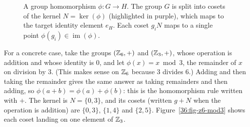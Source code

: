 \begin{figure}[htbp]
\caption{A group homomorphism $\phi: G \to H$. The group $G$ is split into cosets of the kernel $N = \ker(\phi)$ (highlighted in purple), which maps to the target identity element $e_H$. Each coset $g_i N$ maps to a single point $\phi(g_i) \in \operatorname{im}(\phi)$.}\label{36:fig-kernel-coset-homomorphism}
\end{figure}

For a concrete case, take the groups $(\mathbb{Z}_6, +)$ and $(\mathbb{Z}_3, +)$, whose operation is addition and whose identity is $0$, and let $\phi(x) = x \bmod 3$, the remainder of $x$ on division by $3$. (This makes sense on $\mathbb{Z}_6$ because $3$ divides $6$.) Adding and then taking the remainder gives the same answer as taking remainders and then adding, so $\phi(a + b) = \phi(a) + \phi(b)$: this is the homomorphism rule written with $+$. The kernel is $N = \{0, 3\}$, and its cosets (written $g + N$ when the operation is addition) are $\{0, 3\}$, $\{1, 4\}$ and $\{2, 5\}$. Figure~\ref{36:fig-z6-mod3} shows each coset landing on one element of $\mathbb{Z}_3$.

